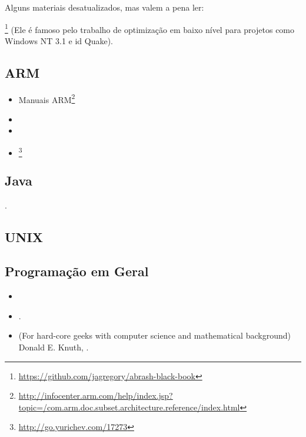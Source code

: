 Alguns materiais desatualizados, mas valem a pena ler:

\MAbrash\footnote{\AlsoAvailableAs \url{https://github.com/jagregory/abrash-black-book}}
(Ele é famoso pelo trabalho de optimização em baixo nível para projetos como Windows NT 3.1 e id Quake).

\subsection{ARM}

\begin{itemize}
\item Manuais ARM\footnote{\AlsoAvailableAs \url{http://infocenter.arm.com/help/index.jsp?topic=/com.arm.doc.subset.architecture.reference/index.html}}

\item \ARMSevenRef

\item \ARMSixFourRefURL

\item \ARMCookBook\footnote{\AlsoAvailableAs \url{http://go.yurichev.com/17273}}
\end{itemize}

\subsection{Java}

\JavaBook.

\subsection{UNIX}

\TAOUP

\subsection{Programação em Geral}

\begin{itemize}

\item \RobPikePractice

\item \HenryWarren.

\item (For hard-core geeks with computer science and mathematical background) Donald E. Knuth, .

\end{itemize}



